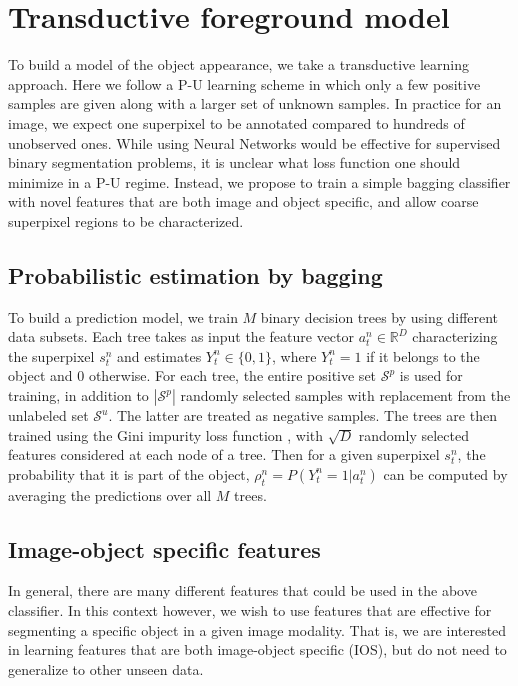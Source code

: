 
\section{Transductive foreground model}
To build a model of the object appearance, we take a transductive learning approach. Here we follow a P-U learning scheme in which only a few positive samples are given along with a larger set of unknown samples. In practice for an image, we expect one superpixel to be annotated compared to hundreds of unobserved ones. While using Neural Networks would be effective for supervised binary segmentation problems, it is unclear what loss function one should minimize in a P-U regime. Instead, we propose to train a simple bagging classifier with novel features that are both image and object specific, and allow coarse superpixel regions to be characterized. 

\subsection{Probabilistic estimation by bagging}
\label{sec:foreground_model}
To build a prediction model, we train $M$ binary decision trees by using different data subsets. Each tree takes as input the feature vector $a_t^n \in \mathbb{R}^D$ characterizing the superpixel $s_t^n$ and estimates $Y_t^n \in \{0,1\}$, where $Y_t^n = 1$ if it belongs to the object and $0$ otherwise. For each tree, the entire positive set $\mathcal{S}^p$ is used for training, in addition to $|\mathcal{S}^p|$ randomly selected samples with replacement from the unlabeled set $\mathcal{S}^u$. The latter are treated as negative samples. The trees are then trained using the Gini impurity loss function \cite{menze09}, with $\sqrt{D}$ randomly selected features considered at each node of a tree. Then for a given superpixel $s_t^n$, the probability that it is part of the object, $\rho_{t}^n = P(Y_t^n = 1 | a_{t}^n )$ can be computed by averaging the predictions over all $M$ trees.

\subsection{Image-object specific features}\label{sec:features}
In general, there are many different features that could be used in the above classifier. In this context however, we wish to use features that are effective for segmenting a specific object in a given image modality. That is, we are interested in learning features that are both image-object specific (IOS), but do not need to generalize to other unseen data. 

